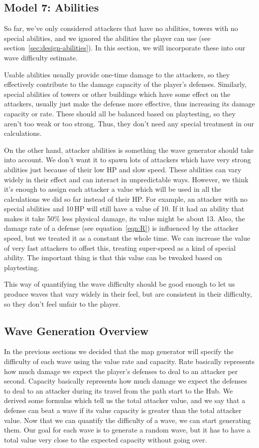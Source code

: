 \subsection{Model 7: Abilities}\label{sec:analysis-waves-abilities}
So far, we've only considered attackers that have no abilities, towers with no special abilities, and we ignored the abilities the player can use (see section~\ref{sec:design-abilities}).
In this section, we will incorporate these into our wave difficulty estimate.

Usable abilities usually provide one-time damage to the attackers, so they effectively contribute to the damage capacity of the player's defenses.
Similarly, special abilities of towers or other buildings which have some effect on the attackers, usually just make the defense more effective, thus increasing its damage capacity or rate.
These should all be balanced based on playtesting, so they aren't too weak or too strong.
Thus, they don't need any special treatment in our calculations.

On the other hand, attacker abilities is something the wave generator should take into account.
We don't want it to spawn lots of attackers which have very strong abilities just because of their low HP and slow speed.
These abilities can vary widely in their effect and can interact in unpredictable ways.
However, we think it's enough to assign each attacker a value which will be used in all the calculations we did so far instead of their HP.
For example, an attacker with no special abilities and 10\,HP will still have a value of 10.
If it had an ability that makes it take 50\% less physical damage, its value might be about 13.
Also, the damage rate of a defense (see equation~\ref{eqn:R}) is influenced by the attacker speed, but we treated it as a constant the whole time.
We can increase the value of very fast attackers to offset this, treating super-speed as a kind of special ability.
The important thing is that this value can be tweaked based on playtesting.

This way of quantifying the wave difficulty should be good enough to let us produce waves that vary widely in their feel, but are consistent in their difficulty, so they don't feel unfair to the player.

\subsection{Wave Generation Overview}

In the previous sections we decided that the map generator will specify the difficulty of each wave using the value rate and capacity.
Rate basically represents how much damage we expect the player's defenses to deal to an attacker per second.
Capacity basically represents how much damage we expect the defenses to deal to an attacker during its travel from the path start to the Hub.
We derived some formulas which tell us the total attacker value, and we say that a defense can beat a wave if its value capacity is greater than the total attacker value.
Now that we can quantify the difficulty of a wave, we can start generating them.
Our goal for each wave is to generate a random wave, but it has to have a total value very close to the expected capacity without going over.

